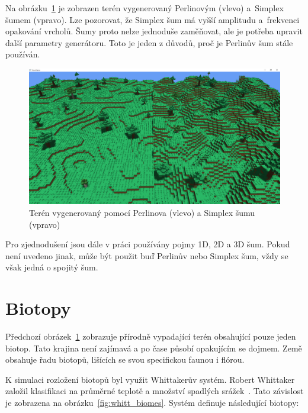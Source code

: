 \documentclass[thesis=M,czech]{FITthesis}[2019/12/23]
\begin{document}
Na obrázku~\ref{fig:perlin_simplex} je zobrazen terén vygenerovaný Perlinovým (vlevo) a~Simplex šumem (vpravo). Lze pozorovat, že Simplex šum má vyšší amplitudu a~frekvenci opakování vrcholů. Šumy proto nelze jednoduše zaměňovat, ale je potřeba upravit další parametry generátoru. Toto je jeden z důvodů, proč je Perlinův šum stále používán.

\begin{figure}\centering
	\includegraphics[width=\textwidth]{images/world_gen/perlin_simplex}
	\caption[Terén vygenerovaný pomocí Perlinova a Simplex šumu]{Terén vygenerovaný pomocí Perlinova (vlevo) a Simplex šumu (vpravo)}\label{fig:perlin_simplex}
\end{figure}

Pro zjednodušení jsou dále v práci používány pojmy 1D, 2D a 3D šum. Pokud není uvedeno jinak, může být použit buď Perlinův nebo Simplex šum, vždy se však jedná o spojitý šum.

\section{Biotopy}

Předchozí obrázek~\ref{fig:perlin_simplex} zobrazuje přírodně vypadající terén obsahující pouze jeden biotop. Tato krajina není zajímavá a po čase působí opakujícím se dojmem. Země obsahuje řadu biotopů, lišících se svou specifickou faunou i flórou. 

K simulaci rozložení biotopů byl využit Whittakerův systém. Robert Whittaker založil klasifikaci na průměrné teplotě a množství spadlých srážek~\cite{whitt}. Tato závislost je zobrazena na obrázku~\ref{fig:whitt_biomes}. Systém definuje následující biotopy:
\end{document}
